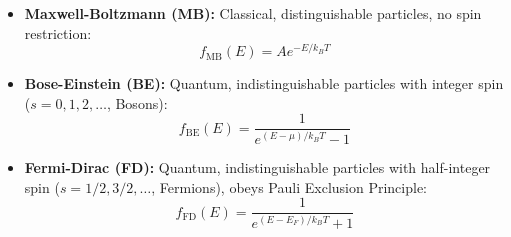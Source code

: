 \documentclass[12pt,a4paper]{article}
\begin{document}
\begin{tcolorbox}[formulabox, title={\textbf{Three Distribution Functions}}]
\begin{itemize}[leftmargin=*, itemsep=3pt]
  \item \textbf{Maxwell-Boltzmann (MB):} Classical, distinguishable particles, no spin restriction:
  \begin{equation}
  f_{\text{MB}}(E) = A e^{-E / k_B T}
  \end{equation}
  \item \textbf{Bose-Einstein (BE):} Quantum, indistinguishable particles with integer spin ($s=0, 1, 2, \ldots$, Bosons):
  \begin{equation}
  f_{\text{BE}}(E) = \frac{1}{e^{(E-\mu)/k_B T} - 1}
  \end{equation}
  \item \textbf{Fermi-Dirac (FD):} Quantum, indistinguishable particles with half-integer spin ($s=1/2, 3/2, \ldots$, Fermions), obeys Pauli Exclusion Principle:
  \begin{equation}
  f_{\text{FD}}(E) = \frac{1}{e^{(E-E_F)/k_B T} + 1}
  \end{equation}
\end{itemize}
\end{tcolorbox}
\end{document}
